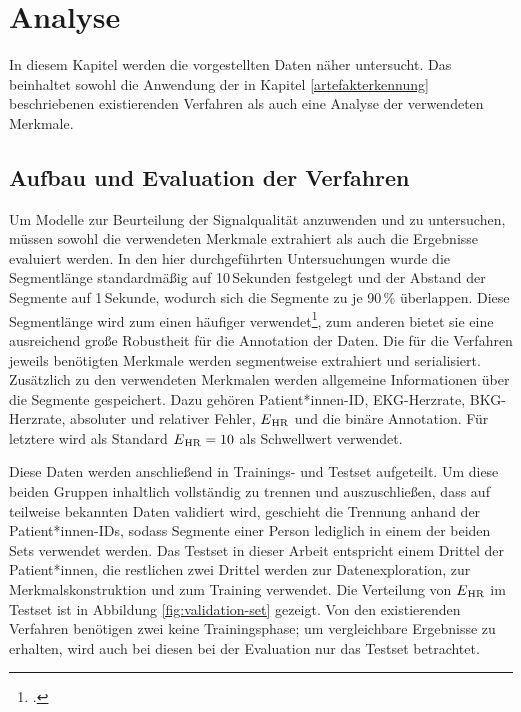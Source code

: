 \chapter{Analyse}\label{analyse}

In diesem Kapitel werden die vorgestellten Daten näher untersucht. Das beinhaltet sowohl die Anwendung der in Kapitel \ref{artefakterkennung} beschriebenen existierenden Verfahren als auch eine Analyse der verwendeten Merkmale.

\section{Aufbau und Evaluation der Verfahren}

Um Modelle zur Beurteilung der Signalqualität anzuwenden und zu untersuchen, müssen sowohl die verwendeten Merkmale extrahiert als auch die Ergebnisse evaluiert werden. In den hier durchgeführten Untersuchungen wurde die Segmentlänge standardmäßig auf 10\,Sekunden festgelegt und der Abstand der Segmente auf 1\,Sekunde, wodurch sich die Segmente zu je 90\,\% überlappen. Diese Segmentlänge wird zum einen häufiger verwendet\footcite{Yu2020, Sadek2016, Orphanidou2015}, zum anderen bietet sie eine ausreichend große Robustheit für die Annotation der Daten. Die für die Verfahren jeweils benötigten Merkmale werden segmentweise extrahiert und serialisiert. Zusätzlich zu den verwendeten Merkmalen werden allgemeine Informationen über die Segmente gespeichert. Dazu gehören Patient*innen-ID, EKG-Herzrate, BKG-Herzrate, absoluter und relativer Fehler, $E\textsubscript{HR}$ und die binäre Annotation. Für letztere wird als Standard $E\textsubscript{HR} = 10$ als Schwellwert verwendet.

Diese Daten werden anschließend in Trainings- und Testset aufgeteilt. Um diese beiden Gruppen inhaltlich vollständig zu trennen und auszuschließen, dass auf teilweise bekannten Daten validiert wird, geschieht die Trennung anhand der Patient*innen-IDs, sodass Segmente einer Person lediglich in einem der beiden Sets verwendet werden. Das Testset in dieser Arbeit entspricht einem Drittel der Patient*innen, die restlichen zwei Drittel werden zur Datenexploration, zur Merkmalskonstruktion und zum Training verwendet. Die Verteilung von $E\textsubscript{HR}$ im Testset ist in Abbildung \ref{fig:validation-set} gezeigt. Von den existierenden Verfahren benötigen zwei keine Trainingsphase; um vergleichbare Ergebnisse zu erhalten, wird auch bei diesen bei der Evaluation nur das Testset betrachtet.


